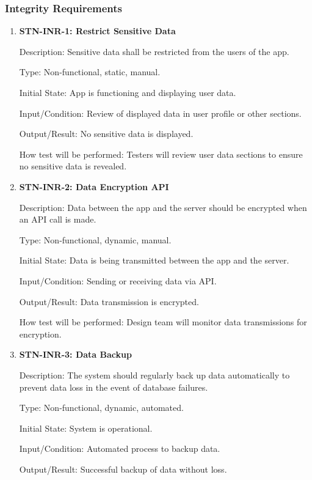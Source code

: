 \documentclass[12pt, titlepage]{article}
\begin{document}
    \subsubsection{Integrity Requirements}

    \begin{enumerate}

        \item {\textbf{STN-INR-1: Restrict Sensitive Data}}

        Description: Sensitive data shall be restricted from the users of the app.

        Type: Non-functional, static, manual.

        Initial State: App is functioning and displaying user data.

        Input/Condition: Review of displayed data in user profile or other sections.

        Output/Result: No sensitive data is displayed.

        How test will be performed: Testers will review user data sections to ensure no sensitive data is revealed.

        \item{\textbf{STN-INR-2: Data Encryption API}}

        Description:  Data between the app and the server should be encrypted when an API call is made.

        Type: Non-functional, dynamic, manual.

        Initial State: Data is being transmitted between the app and the server.

        Input/Condition: Sending or receiving data via API.

        Output/Result: Data transmission is encrypted.

        How test will be performed: Design team will monitor data transmissions for encryption.


        \item \textbf{{STN-INR-3: Data Backup}}

        Description: The system should regularly back up data automatically to prevent data loss in the event of database failures.

        Type: Non-functional, dynamic, automated.

        Initial State: System is operational.

        Input/Condition: Automated process to backup data.

        Output/Result: Successful backup of data without loss.


\end{enumerate}
\end{document}
